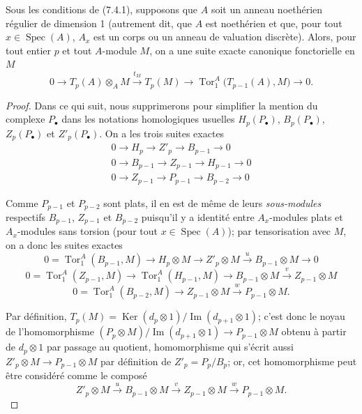 \begin{proposition}[7.6.3]
Sous les conditions de \textup{(7.4.1)}, supposons que $A$ soit un anneau noethérien
régulier de dimension 1 (autrement dit, que $A$ est noethérien et que, pour tout
$x\in\operatorname{Spec}(A)$, $A_x$ est un corps ou un anneau de valuation
discrète). Alors, pour tout entier $p$ et tout $A$-module $M$, on a une suite
exacte canonique fonctorielle en $M$
\[
  0
  \longrightarrow T_p(A)\otimes_A M
  \xrightarrow{t_M}T_p(M)
  \longrightarrow \operatorname{Tor}_1^A\bigl(T_{p-1}(A),M\bigr)
  \longrightarrow0.
  \tag{7.6.3.1}\label{III.7.6.3.1.fr}
\]
\end{proposition}

\begin{proof}
Dans ce qui suit, nous supprimerons pour simplifier la mention du complexe
$P_\bullet$ dans les notations homologiques usuelles $H_p(P_\bullet)$,
$B_p(P_\bullet)$, $Z_p(P_\bullet)$ et $Z'_p(P_\bullet)$. On a les trois suites
exactes
\begin{gather*}
  0\longrightarrow H_p\longrightarrow Z'_p\longrightarrow B_{p-1}
  \longrightarrow0\\
  0\longrightarrow B_{p-1}\longrightarrow Z_{p-1}\longrightarrow H_{p-1}
  \longrightarrow0\\
  0\longrightarrow Z_{p-1}\longrightarrow P_{p-1}\longrightarrow B_{p-2}
  \longrightarrow0
\end{gather*}

Comme $P_{p-1}$ et $P_{p-2}$ sont plats, il en est de même de leurs
\emph{sous-modules} respectifs $B_{p-1}$, $Z_{p-1}$ et $B_{p-2}$ puisqu'il y a
identité entre $A_x$-modules plats et $A_x$-modules sans torsion (pour tout
$x\in\operatorname{Spec}(A)$); par tensorisation avec $M$, on a donc les suites
exactes
\[
  0=\operatorname{Tor}_1^A(B_{p-1},M)
  \longrightarrow H_p\otimes M
  \longrightarrow Z'_p\otimes M
  \xrightarrow{u}B_{p-1}\otimes M
  \longrightarrow0
  \tag{7.6.3.2}\label{III.7.6.3.2.fr}
\]
\[
  0=\operatorname{Tor}_1^A(Z_{p-1},M)
  \longrightarrow\operatorname{Tor}_1^A(H_{p-1},M)
  \longrightarrow B_{p-1}\otimes M
  \xrightarrow{v}Z_{p-1}\otimes M
  \tag{7.6.3.3}\label{III.7.6.3.3.fr}
\]
\[
  0=\operatorname{Tor}_1^A(B_{p-2},M)
  \longrightarrow Z_{p-1}\otimes M
  \xrightarrow{w}P_{p-1}\otimes M.
  \tag{7.6.3.4}\label{III.7.6.3.4.fr}
\]

Par définition,
$T_p(M)=\operatorname{Ker}(d_p\otimes1)/\operatorname{Im}(d_{p+1}\otimes1)$;
c'est donc le noyau de l'homomorphisme
$(P_p\otimes M)/\operatorname{Im}(d_{p+1}\otimes1)\longrightarrow P_{p-1}\otimes M$
obtenu à partir de $d_p\otimes1$ par passage au quotient, homomorphisme qui
s'écrit aussi $Z'_p\otimes M\to P_{p-1}\otimes M$ par définition de
$Z'_p=P_p/B_p$; or, cet homomorphisme peut être considéré comme le composé
\[
  Z'_p\otimes M
  \xrightarrow{u}B_{p-1}\otimes M
  \xrightarrow{v}Z_{p-1}\otimes M
  \xrightarrow{w}P_{p-1}\otimes M.
\]


\end{proof}
